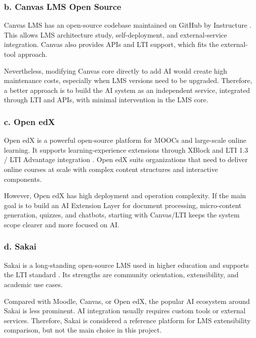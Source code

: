\subsubsection*{b. Canvas LMS Open Source}

Canvas LMS has an open-source codebase maintained on GitHub by Instructure
\cite{canvas-oss}. This allows LMS architecture study, self-deployment, and
external-service integration. Canvas also provides APIs and LTI support, which
fits the external-tool approach.

Nevertheless, modifying Canvas core directly to add AI would create high
maintenance costs, especially when LMS versions need to be upgraded. Therefore,
a better approach is to build the AI system as an independent service,
integrated through LTI and APIs, with minimal intervention in the LMS core.

\subsubsection*{c. Open edX}

Open edX is a powerful open-source platform for MOOCs and large-scale online
learning. It supports learning-experience extensions through XBlock and LTI
1.3 / LTI Advantage integration \cite{openedx-lti}. Open edX suits
organizations that need to deliver online courses at scale with complex content
structures and interactive components.

However, Open edX has high deployment and operation complexity. If the main
goal is to build an AI Extension Layer for document processing, micro-content
generation, quizzes, and chatbots, starting with Canvas/LTI keeps the system
scope clearer and more focused on AI.

\subsubsection*{d. Sakai}

Sakai is a long-standing open-source LMS used in higher education and supports
the LTI standard \cite{sakai-lms}. Its strengths are community orientation,
extensibility, and academic use cases.

Compared with Moodle, Canvas, or Open edX, the popular AI ecosystem around
Sakai is less prominent. AI integration usually requires custom tools or
external services. Therefore, Sakai is considered a reference platform for LMS
extensibility comparison, but not the main choice in this project.

